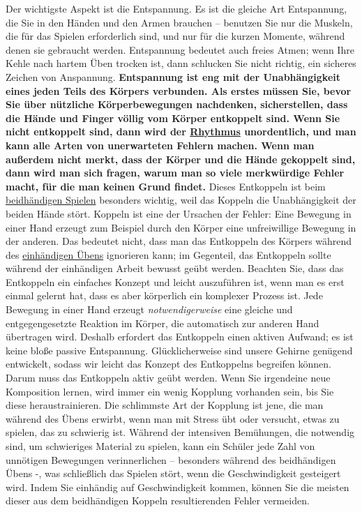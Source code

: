 Der wichtigste Aspekt ist die Entspannung.
Es ist die gleiche Art Entspannung, die Sie in den Händen und den Armen brauchen -- benutzen Sie nur die Muskeln, die für das Spielen erforderlich sind, und nur für die kurzen Momente, während denen sie gebraucht werden.
Entspannung bedeutet auch freies Atmen; wenn Ihre Kehle nach hartem Üben trocken ist, dann schlucken Sie nicht richtig, ein sicheres Zeichen von Anspannung.
\textbf{Entspannung ist eng mit der Unabhängigkeit eines jeden Teils des Körpers verbunden.
Als erstes müssen Sie, bevor Sie über nützliche Körperbewegungen nachdenken, sicherstellen, dass die Hände und Finger völlig vom Körper entkoppelt sind.
Wenn Sie nicht entkoppelt sind, dann wird der \hyperref[c1iii1b]{Rhythmus} unordentlich, und man kann alle Arten von unerwarteten Fehlern machen.
Wenn man außerdem nicht merkt, dass der Körper und die Hände gekoppelt sind, dann wird man sich fragen, warum man so viele merkwürdige Fehler macht, für die man keinen Grund findet.}
Dieses Entkoppeln ist beim \hyperref[c1ii25]{beidhändigen Spielen} besonders wichtig, weil das Koppeln die Unabhängigkeit der beiden Hände stört.
Koppeln ist eine der Ursachen der Fehler: Eine Bewegung in einer Hand erzeugt zum Beispiel durch den Körper eine unfreiwillige Bewegung in der anderen.
Das bedeutet nicht, dass man das Entkoppeln des Körpers während des \hyperref[c1ii7]{einhändigen Übens} ignorieren kann; im Gegenteil, das Entkoppeln sollte während der einhändigen Arbeit bewusst geübt werden.
Beachten Sie, dass das Entkoppeln ein einfaches Konzept und leicht auszuführen ist, wenn man es erst einmal gelernt hat, dass es aber körperlich ein komplexer Prozess ist.
Jede Bewegung in einer Hand erzeugt \textit{notwendigerweise} eine gleiche und entgegengesetzte Reaktion im Körper, die automatisch zur anderen Hand übertragen wird.
Deshalb erfordert das Entkoppeln einen aktiven Aufwand; es ist keine bloße passive Entspannung.
Glücklicherweise sind unsere Gehirne genügend entwickelt, sodass wir leicht das Konzept des Entkoppelns begreifen können.
Darum muss das Entkoppeln aktiv geübt werden.
Wenn Sie irgendeine neue Komposition lernen, wird immer ein wenig Kopplung vorhanden sein, bis Sie diese heraustrainieren.
Die schlimmste Art der Kopplung ist jene, die man während des Übens erwirbt, wenn man mit Stress übt oder versucht, etwas zu spielen, das zu schwierig ist.
Während der intensiven Bemühungen, die notwendig sind, um schwieriges Material zu spielen, kann ein Schüler jede Zahl von unnötigen Bewegungen verinnerlichen -- besonders während des beidhändigen Übens -, was schließlich das Spielen stört, wenn die Geschwindigkeit gesteigert wird.
Indem Sie einhändig auf Geschwindigkeit kommen, können Sie die meisten dieser aus dem beidhändigen Koppeln resultierenden Fehler vermeiden.

